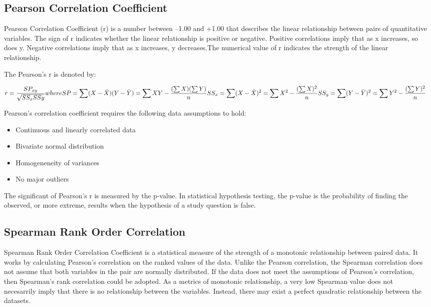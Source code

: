 \subsection{Pearson Correlation Coefficient}
Pearson Correlation Coefficient (r) is a number between –1.00 and +1.00 that describes the linear relationship between pairs of quantitative variables. The sign of r indicates whether the linear relationship is positive or negative. Positive correlations imply that as x increases, so does y. Negative correlations imply that as x increases, y decreases.The numerical value of r indicates the strength of the linear relationship.

The Pearson's r is denoted by:

\begin{equation}
r = \frac{SP_{xy}}{\sqrt{SS_{x}SS{y}}}\\
where SP = \sum(X-\bar{X})(Y-\bar{Y}) = \sum XY - \frac{(\sum X)(\sum Y)}{n}\\
SS_{x} = \sum (X - \bar{X})^{2} = \sum X^{2} - \frac{(\sum X)^{2}}{n}
SS_{y} = \sum (Y - \bar{Y})^{2} = \sum Y^{2} - \frac{(\sum Y)^{2}}{n}
\label{eq: correlation coefficient}
\end{equation}

Pearson's correlation coefficient requires the following data assumptions to hold:
\begin{itemize}
	\item Continuous and linearly correlated data
	\item Bivariate normal distribution
	\item Homogeneneity of variances
	\item No major outliers
\end{itemize}

The significant of Pearson's r  is measured by the p-value. In statistical hypothesis testing, the p-value is the probability of finding the observed, or more extreme, results when the hypothesis of a study question is false.

\subsection{Spearman Rank Order Correlation}
Spearman Rank Order Correlation Coefficient is a statistical measure of the strength of a monotonic relationship between paired data. It works by calculating Pearson’s correlation on the ranked values of the data. Unlike the Pearson correlation, the Spearman correlation does not assume that both variables in the pair are normally distributed. If the data does not meet the assumptions of Pearson's correlation, then Spearman’s rank correlation could be adopted. As a metrics of monotonic relationship, a very low Spearman value does not necesarrily imply that there is no relationship between the variables. Instead, there may exist a perfect quadratic relationship between the datasets.